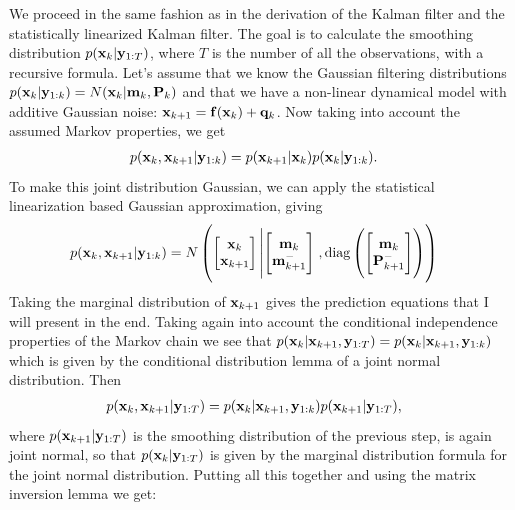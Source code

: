 \documentclass[a4paper,oneside,article]{memoir}
\begin{document}
\subsubsection{}\label{sec:7_3a}
We proceed in the same fashion as in the derivation of the Kalman filter and the statistically linearized
Kalman filter. The goal is to calculate the smoothing distribution $p(\mathbf{x}_k|\mathbf{y}_{1:T})$, where $T$ is the number
of all the observations, with a recursive formula. Let's assume that we know the Gaussian filtering distributions $p(\mathbf{x}_k|\mathbf{y}_{1:k})=N(\mathbf{x}_k|\mathbf{m}_k,\mathbf{P}_k)$
and that we have a non-linear dynamical model with additive Gaussian noise: $\mathbf{x}_{k+1}=\mathbf{f}(\mathbf{x}_{k})+\mathbf{q}_{k}$. Now taking
into account the assumed Markov properties, we get
\begin{align}
	p(\mathbf{x}_k,\mathbf{x}_{k+1}|\mathbf{y}_{1:k})&=p(\mathbf{x}_{k+1}|\mathbf{x}_k)p(\mathbf{x}_k|\mathbf{y}_{1:k}).
\end{align}
To make this joint distribution Gaussian, we can apply the statistical linearization based Gaussian approximation, giving
\begin{align}
	p(\mathbf{x}_k,\mathbf{x}_{k+1}|\mathbf{y}_{1:k})&=
	N\left(
	\begin{bmatrix}
		\mathbf{x}_k\\\mathbf{x}_{k+1}
	\end{bmatrix}\left\vert
	\begin{bmatrix}
		\mathbf{m}_{k}\\
		\mathbf{m}_{k+1}^-
	\end{bmatrix}
	\right.,
	\textrm{diag}\left(
	\begin{bmatrix}
		\mathbf{m}_{k}\\
		\mathbf{P}_{k+1}^-
	\end{bmatrix}
	\right)\right)
\end{align}
Taking the marginal distribution of $\mathbf{x}_{k+1}$ gives the prediction
equations that I will present in the end. Taking again into account
the conditional independence properties of the Markov chain we see that
$p(\mathbf{x}_k|\mathbf{x}_{k+1},\mathbf{y}_{1:T})=p(\mathbf{x}_k|\mathbf{x}_{k+1},\mathbf{y}_{1:k})$ which is given by the 
conditional distribution lemma of a joint normal distribution. Then
\begin{align}
	p(\mathbf{x}_k,\mathbf{x}_{k+1}|\mathbf{y}_{1:T})&=p(\mathbf{x}_k|\mathbf{x}_{k+1},\mathbf{y}_{1:k})p(\mathbf{x}_{k+1}|\mathbf{y}_{1:T}),
\end{align}
where $p(\mathbf{x}_{k+1}|\mathbf{y}_{1:T})$ is the smoothing distribution of the previous step,
is again joint normal, so that $p(\mathbf{x}_k|\mathbf{y}_{1:T})$ is given by the marginal
distribution formula for the joint normal distribution. Putting all this together
and using the matrix inversion lemma we get:
\end{document}
